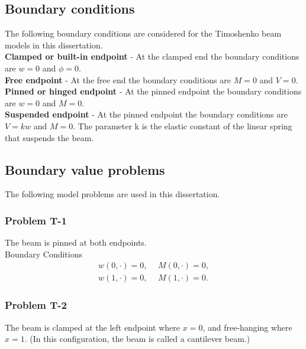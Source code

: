 \documentclass[../../main.tex]{subfiles}
\begin{document}
\subsection{Boundary conditions}\label{ssec:1D_Model:BoundaryConditions}
The following boundary conditions are considered for the Timoshenko beam models in this dissertation.\\

\textbf{Clamped or built-in endpoint} - At the clamped end the boundary conditions are $w = 0$ and $\phi = 0$.\\

\textbf{Free endpoint} - At the free end the boundary conditions are $M = 0$ and $V = 0$.\\

\textbf{Pinned or hinged endpoint} - At the pinned endpoint the boundary conditions are $w = 0$ and $M = 0$.\\

\textbf{Suspended endpoint} - At the pinned endpoint the boundary conditions are $V = kw$ and $M = 0$. The parameter k is the elastic constant of the linear spring that suspends the beam.

\subsection{Boundary value problems}\label{ssec:1D_Model:ModelProblems}
The following model problems are used in this dissertation.  

\subsubsection*{Problem T-1}\label{sssec:1D_Model:ProblemT1}
The beam is pinned at both endpoints.\\

{Boundary Conditions}\\
\begin{eqnarray*}
	w(0,\cdot) = 0, \ \ &M(0,\cdot) = 0, \label{eq:1D_Model:ProblemT1BC1}\\
	w(1,\cdot) = 0, \ \ &M(1,\cdot) = 0. \label{eq:1D_Model:ProblemT1BC2}
\end{eqnarray*}

\subsubsection*{Problem T-2}\label{sssec:1D_Model:ProblemT2}
The beam is clamped at the left endpoint where $x = 0$, and free-hanging where $x = 1$. (In this configuration, the beam is called a cantilever beam.)\\
\end{document}

